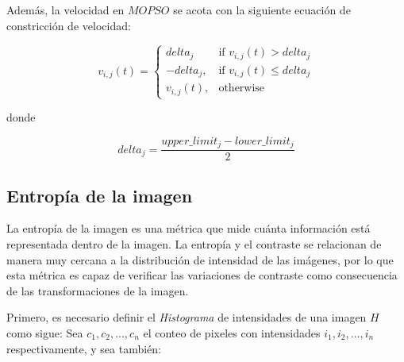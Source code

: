 Además, la velocidad en $MOPSO$ se acota con la siguiente ecuación de constricción de velocidad:

\begin{equation}\label{eq:restricciondelta}
v_{i,j}(t)= 
\begin{cases}
    delta_j & \text{if } v_{i,j}(t) > delta_j\\
    -delta_j,      & \text{if } v_{i,j}(t) \leq delta_j \\
    v_{i,j}(t),      & \text{otherwise }
\end{cases}
\end{equation}

donde


\begin{equation}
delta_j=\frac{upper\_limit_j - lower\_limit_j}{2}
\end{equation}


\subsection{Entropía de la imagen}

La entropía de la imagen \cite{108593} es una métrica que mide cuánta información está representada dentro de la imagen. La entropía y el contraste se relacionan de manera muy cercana a la distribución de intensidad de las imágenes, por lo que esta métrica es capaz de verificar las variaciones de contraste como consecuencia de las transformaciones de la imagen.


Primero, es necesario definir el \textit{Histograma} de intensidades de una imagen $H$ como sigue: Sea $c_1, c_2, ..., c_n$ el conteo de pixeles con intensidades $i_1, i_2, ..., i_n$ respectivamente, y sea también:


